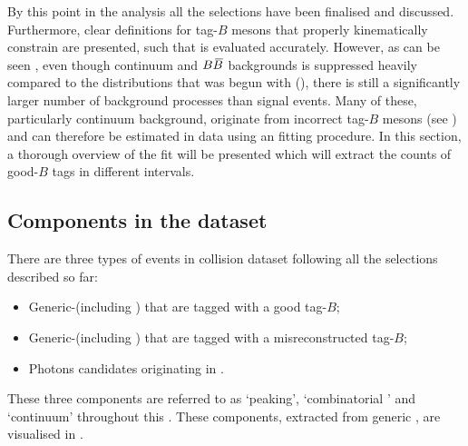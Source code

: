 By this point in the analysis all the selections have been finalised and discussed.
Furthermore, clear definitions for tag-$B$ mesons that properly kinematically constrain \BtoXsgamma are presented, such that \EB is evaluated accurately.
However, as can be seen , even though continuum and $B\kern 0.18em\overline{\kern -0.18em B}{}$ backgrounds is suppressed heavily compared to the \EB distributions that was begun with (),
there is still a significantly larger number of background processes than \BtoXsgamma signal events.
Many of these, particularly continuum background, originate from incorrect tag-$B$ mesons (see ) and can therefore be estimated in data using an \Mbc fitting procedure.
In this section, a thorough overview of the \Mbc fit will be presented which will extract the counts of good-$B$ tags in different \EB intervals.

\subsection{Components in the dataset}\label{sec:fitting_components}

There are three types of events in \epem collision dataset following all the selections described so far:
\begin{itemize}
    \item Generic-\BB (including \BtoXsgamma) that are tagged with a good tag-$B$;
    \item Generic-\BB (including \BtoXsgamma) that are tagged with a misreconstructed tag-$B$;
    \item Photons candidates originating in \epem\ra\qqbar.
\end{itemize}
These three components are referred to as `peaking', `combinatorial \BB' and `continuum' throughout this .
These components, extracted from generic \MC, are visualised in .

